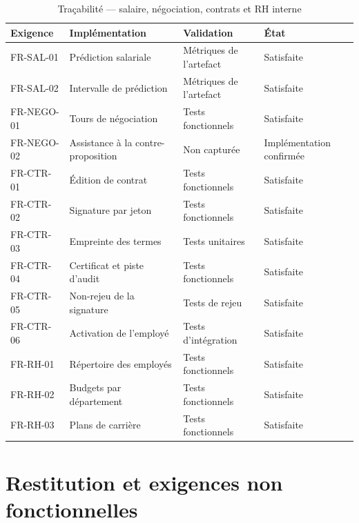 \begin{table}[htbp]
  \centering
  \caption{Traçabilité — salaire, négociation, contrats et RH interne}
  \begin{tabularx}{\textwidth}{L{2.3cm} L{3.4cm} L{3.0cm} X}
    \toprule
    \textbf{Exigence} & \textbf{Implémentation} & \textbf{Validation} & \textbf{État} \\
    \midrule
    FR-SAL-01   & Prédiction salariale & Métriques de l'artefact & Satisfaite \\
    FR-SAL-02   & Intervalle de prédiction & Métriques de l'artefact & Satisfaite \\
    FR-NEGO-01  & Tours de négociation & Tests fonctionnels & Satisfaite \\
    FR-NEGO-02  & Assistance à la contre-proposition & Non capturée & Implémentation confirmée \\
    FR-CTR-01   & Édition de contrat & Tests fonctionnels & Satisfaite \\
    FR-CTR-02   & Signature par jeton & Tests fonctionnels & Satisfaite \\
    FR-CTR-03   & Empreinte des termes & Tests unitaires & Satisfaite \\
    FR-CTR-04   & Certificat et piste d'audit & Tests fonctionnels & Satisfaite \\
    FR-CTR-05   & Non-rejeu de la signature & Tests de rejeu & Satisfaite \\
    FR-CTR-06   & Activation de l'employé & Tests d'intégration & Satisfaite \\
    FR-RH-01    & Répertoire des employés & Tests fonctionnels & Satisfaite \\
    FR-RH-02    & Budgets par département & Tests fonctionnels & Satisfaite \\
    FR-RH-03    & Plans de carrière & Tests fonctionnels & Satisfaite \\
    \bottomrule
  \end{tabularx}
\end{table}

\section{Restitution et exigences non fonctionnelles}

